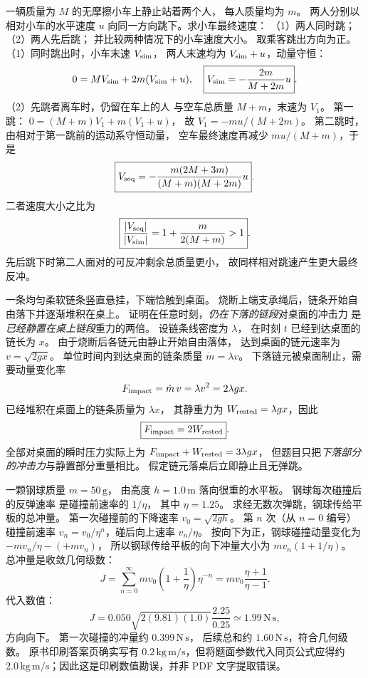 一辆质量为 $M$ 的无摩擦小车上静止站着两个人，
每人质量均为 $m$。
两人分别以相对小车的水平速度 $u$
向同一方向跳下。求小车最终速度：
（1）两人同时跳；
（2）两人先后跳；
并比较两种情况下的小车速度大小。
\exsolution
取乘客跳出方向为正。
（1）同时跳出时，小车末速 $V_{\rm sim}$，
两人末速均为 $V_{\rm sim}+u$，动量守恒：
\[
0=MV_{\rm sim}+2m(V_{\rm sim}+u),
\quad
\boxed{V_{\rm sim}=-\frac{2m}{M+2m}u}.
\]
（2）先跳者离车时，仍留在车上的人
与空车总质量 $M+m$，末速为 $V_1$。
第一跳：
$0=(M+m)V_1+m(V_1+u)$，
故 $V_1=-mu/(M+2m)$。
第二跳时，由相对于第一跳前的运动系守恒动量，
空车最终速度再减少 $mu/(M+m)$，于是
\[
\boxed{V_{\rm seq}=
-\frac{m(2M+3m)}{(M+m)(M+2m)}u}.
\]
二者速度大小之比为
\[
\boxed{\frac{|V_{\rm seq}|}{|V_{\rm sim}|}
=1+\frac{m}{2(M+m)}>1}.
\]
\excheck 先后跳下时第二人面对的可反冲剩余总质量更小，
故同样相对跳速产生更大最终反冲。

一条均匀柔软链条竖直悬挂，下端恰触到桌面。
烧断上端支承绳后，链条开始自由落下并逐渐堆积在桌上。
证明在任意时刻，\emph{仍在下落的链段}对桌面的冲击力
是\emph{已经静置在桌上链段}重力的两倍。
\exsolution
设链条线密度为 $\lambda$，
在时刻 $t$ 已经到达桌面的链长为 $x$。
由于烧断后各链元由静止开始自由落体，
达到桌面的链元速率为 $v=\sqrt{2gx}$。
单位时间内到达桌面的链条质量
$\dot m=\lambda v$。
下落链元被桌面制止，需要动量变化率
\[
F_{\rm impact}=\dot m\,v=\lambda v^2=2\lambda gx.
\]
已经堆积在桌面上的链条质量为 $\lambda x$，
其静重力为
$W_{\rm rested}=\lambda gx$，因此
\[
\boxed{F_{\rm impact}=2W_{\rm rested}}.
\]
\excheck 全部对桌面的瞬时压力实际上为
$F_{\rm impact}+W_{\rm rested}=3\lambda gx$，
但题目只把\emph{下落部分的冲击力}与静置部分重量相比。
假定链元落桌后立即静止且无弹跳。

一颗钢球质量 $m=50\,\mathrm g$，
由高度 $h=1.0\,\mathrm m$ 落向很重的水平板。
钢球每次碰撞后的反弹速率
是碰撞前速率的 $1/\eta$，
其中 $\eta=1.25$。
求经无数次弹跳，钢球传给平板的总冲量。
\exsolution
第一次碰撞前的下降速率
$v_0=\sqrt{2gh}$。
第 $n$ 次（从 $n=0$ 编号）碰撞前速率
$v_n=v_0/\eta^n$，碰后向上速率 $v_n/\eta$。
按向下为正，钢球碰撞动量变化为
$-m v_n/\eta-(+m v_n)$，
所以钢球传给平板的向下冲量大小为
$m v_n(1+1/\eta)$。
总冲量是收敛几何级数：
\[
J=\sum_{n=0}^\infty m v_0
\left(1+\frac1\eta\right)\eta^{-n}
=mv_0\frac{\eta+1}{\eta-1}.
\]
代入数值：
\[
\boxed{J=
0.050\sqrt{2(9.81)(1.0)}
\frac{2.25}{0.25}
\simeq1.99\,\mathrm{N\,s}},
\]
方向向下。
\excheck 第一次碰撞的冲量约 $0.399\,\mathrm{N\,s}$，
后续总和约 $1.60\,\mathrm{N\,s}$，符合几何级数。
原书印刷答案页确实写有 $0.2\,\mathrm{kg\,m/s}$，但将题面参数代入同页公式应得约 $2.0\,\mathrm{kg\,m/s}$；因此这是印刷数值勘误，并非 PDF 文字提取错误。

